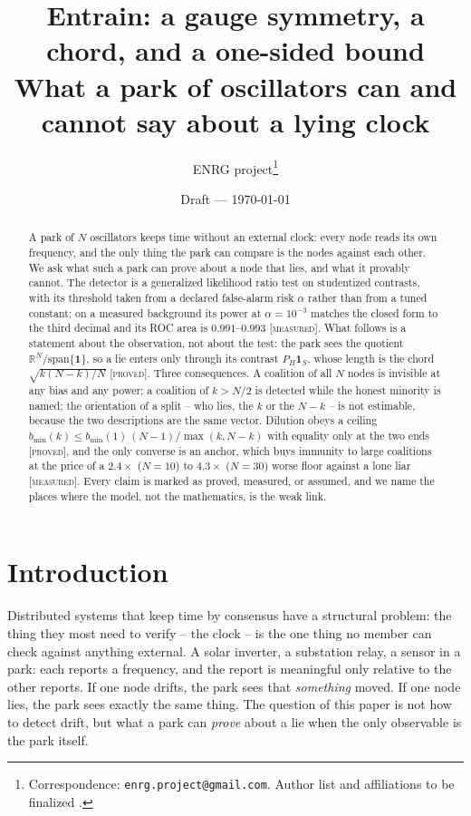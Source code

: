 \documentclass[10pt,twocolumn,a4paper]{article}
\title{\bfseries Entrain: a gauge symmetry, a chord, and a one-sided bound\\
\large What a park of oscillators can and cannot say about a lying clock}
\author{ENRG project\thanks{Correspondence: \texttt{enrg.project@gmail.com}.
Author list and affiliations to be finalized \gap{authors, affiliation, ORCID}.}}
\date{Draft --- \today}
\newcommand{\proved}{\textcolor{teal!70!black}{\textsc{[proved]}}}
\newcommand{\measured}{\textcolor{blue!70!black}{\textsc{[measured]}}}
\theoremstyle{definition}
\theoremstyle{remark}
\newcommand{\PH}{P_{H}}
\newcommand{\one}{\mathbf{1}}
\newcommand{\R}{\mathbb{R}}
\newcommand{\bmin}{b_{\min}}
\begin{document}
\maketitle

\begin{abstract}
A park of $N$ oscillators keeps time without an external clock: every node reads
its own frequency, and the only thing the park can compare is the nodes against
each other. We ask what such a park can prove about a node that lies, and what it
provably cannot. The detector is a generalized likelihood ratio test on
studentized contrasts, with its threshold taken from a declared false-alarm risk
$\alpha$ rather than from a tuned constant; on a measured background its power at
$\alpha=10^{-3}$ matches the closed form to the third decimal and its ROC area is
$0.991$--$0.993$ \measured. What follows is a statement about the observation, not
about the test: the park sees the quotient $\R^N/\mathrm{span}\{\one\}$, so a lie
enters only through its contrast $\PH\one_S$, whose length is the chord
$\sqrt{k(N-k)/N}$ \proved. Three consequences. A coalition of all $N$ nodes is
invisible at any bias and any power; a coalition of $k>N/2$ is detected while the
honest minority is named; the orientation of a split -- who lies, the $k$ or the
$N-k$ -- is not estimable, because the two descriptions are the same vector.
Dilution obeys a ceiling $\bmin(k)\le\bmin(1)\,(N-1)/\max(k,N-k)$ with equality
only at the two ends \proved, and the only converse is an anchor, which buys
immunity to large coalitions at the price of a $2.4\times$ ($N=10$) to $4.3\times$
($N=30$) worse floor against a lone liar \measured. Every claim is marked as
proved, measured, or assumed, and we name the places where the model, not the
mathematics, is the weak link.
\end{abstract}

\section{Introduction}
\label{sec:intro}

Distributed systems that keep time by consensus have a structural problem: the
thing they most need to verify -- the clock -- is the one thing no member can
check against anything external. A solar inverter, a substation relay, a sensor
in a park: each reports a frequency, and the report is meaningful only relative
to the other reports. If one node drifts, the park sees that \emph{something}
moved. If one node lies, the park sees exactly the same thing. The question of
this paper is not how to detect drift, but what a park can \emph{prove} about a
lie when the only observable is the park itself.
\end{document}
